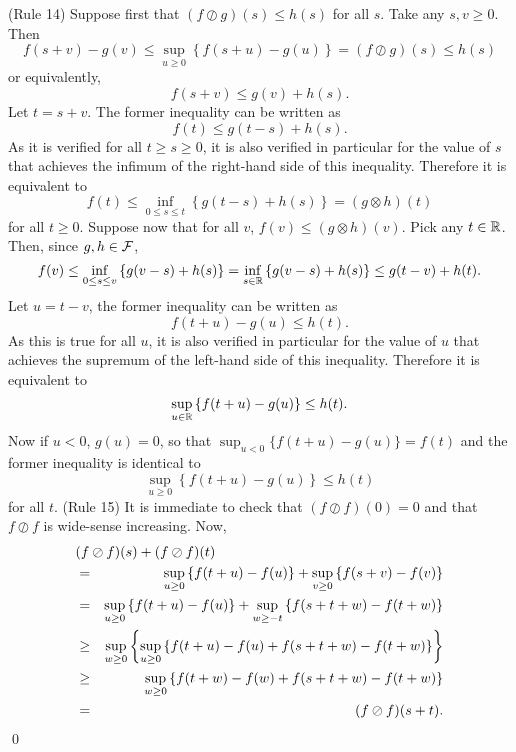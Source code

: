 \vspace{1ex}
\noindent
(Rule 14) %
Suppose first that $(f \oslash g)(s) \leq h(s)$ for all $s$. Take any $s, v \geq 0$. Then
$$ f(s + v) - g(v) \leq \sup_{u \geq 0}  \left\{ f(s+u) - g(u)  \right\} = (f \oslash g)(s) \leq h(s) $$
or equivalently,
$$ f(s+v) \leq g(v) + h(s) .$$
Let $t = s+v$. The former inequality can be written as
$$ f(t) \leq g(t-s) + h(s). $$
As it is verified for all $t \geq s \geq 0$, it is also verified
in particular for the value of $s$ that achieves the infimum of
the right-hand side of this inequality. Therefore it is equivalent
to
$$ f(t) \leq \inf_{0 \leq s \leq t} \left\{ g(t-s) + h(s) \right\} = (g \otimes h)(t) $$
for all $t \geq 0$.
Suppose now that for all $v$, $f(v) \leq (g \otimes h)(v) $. Pick any $t  \in \mathbb{R}$. Then, since $g, h \in \mathcal F$,
$$ f(v) \leq \inf_{0 \leq s \leq v} \left\{ g(v-s) + h(s) \right\} =
\inf_{s \in \mathbb{R}} \left\{ g(v-s) + h(s) \right\} \leq g(t-v) + h(t). $$
 Let $u = t-v$, the former inequality can be written as
$$ f(t+u) - g(u) \leq h(t) . $$
As this is true for all $u$, it is also verified in particular for
the value of $u$ that achieves the supremum of the left-hand side
of this inequality. Therefore it is equivalent to
$$ \sup_{u \in \mathbb{R}} \left\{ f(t+u) - g(u) \right\} \leq h(t) . $$
Now if $u < 0$, $g(u) = 0$, so that $\sup_{u < 0} \{ f(t+u) - g(u) \} = f(t)$
and the former inequality is identical to
$$ \sup_{u \geq 0} \left\{ f(t+u) - g(u) \right\} \leq h(t) $$
for all $t$.
\vspace{1ex}
\noindent
(Rule 15) It is immediate to check that $(f \oslash f)(0) = 0$ and that $f \oslash f$ is wide-sense increasing.
Now,
\begin{eqnarray*}
\lefteqn{ (f \oslash f)(s) + (f \oslash f)(t)} \\
   & = & \sup_{u \geq 0} \left\{
f(t+u) - f(u) \right\} +
                    \sup_{v \geq 0} \left\{ f(s+v) - f(v) \right\} \\
                   & = & \sup_{u \geq 0} \left\{ f(t+u) - f(u) \right\} +
                    \sup_{w \geq -t} \left\{ f(s+t+w) - f(t+w) \right\} \\
            &  \geq    & \sup_{w \geq 0} \left\{ \sup_{u \geq 0}
                    \left\{ f(t+u) - f(u) + f(s+t+w) - f(t+w) \right\} \right\} \\
              & \geq    & \sup_{w \geq 0}
                    \left\{ f(t+w) - f(w) + f(s+t+w) - f(t+w) \right\} \\
            & =     &  (f \oslash f)(s + t).
\end{eqnarray*}
\qed

